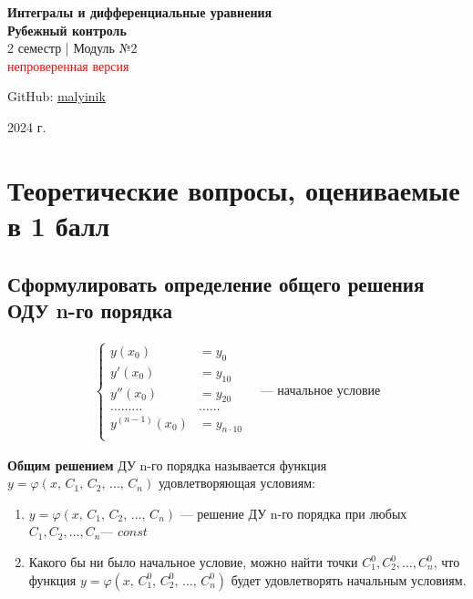 



\begin{titlepage}
    \vspace*{0pt}
    \vfill
    \centering
    \Huge\textbf{Интегралы и дифференциальные уравнения} \\[7pt]
    \Large\textbf{Рубежный контроль} \\
    \large 2 семестр | Модуль №2 \\[1ex]
    \Large\textcolor{red}{\textsf{непроверенная версия}}\\
    \vfill
    \begin{flushright}
        \normalsize GitHub: \href{https://github.com/malyinik}{malyinik} \\
    \end{flushright}
    \normalsize 2024 г.
\end{titlepage}
\newpage

\tableofcontents
\newpage

\section{Теоретические вопросы, оцениваемые в 1 балл}

\subsection{Сформулировать определение общего решения ОДУ n-го порядка}

\begin{gather*}
    \left\{ \begin{aligned}
        y(x_0) &= y_0 \\
        y'(x_0) &= y_{10} \\
        y''(x_0) &= y_{20} \\
        \ldots\ldots\ldots&\ldots\ldots \\
        y^{(n-1)}(x_0) &= y_{n\cdot 10} \\
    \end{aligned} \right. \quad \text{--- начальное условие}
\end{gather*}

\begin{definition*}
    \textbf{Общим решением} ДУ n-го порядка называется функция \break$y = \varphi(x,\, C_1,\, C_2,\, \ldots,\, C_n)$ удовлетворяющая условиям:
    \begin{enumerate}
        \item $y = \varphi(x,\, C_1,\, C_2,\, \ldots,\, C_n)$ --- решение ДУ n-го порядка при любых $C_1, C_2, \ldots, C_n$\nobreak --- $const$
        \item Какого бы ни было начальное условие, можно найти точки $C_1^0, C_2^0, \ldots, C_n^0$, что функция $y = \varphi(x,\, C_1^0,\, C_2^0,\, \ldots,\, C_n^0)$ будет удовлетворять начальным условиям.
    \end{enumerate}
\end{definition*}

